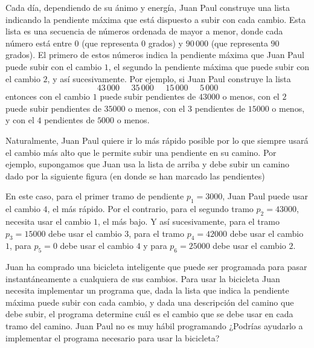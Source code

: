 \documentclass{oci}
\begin{document}
\begin{problemDescription}
Cada día, dependiendo de su ánimo y energía, Juan Paul construye una lista indicando la pendiente 
máxima que está dispuesto a 
subir con cada cambio. 
Esta lista es una secuencia de números ordenada de mayor a menor, donde cada
número está entre $0$ (que representa $0$ grados) y $90\,000$ (que representa
$90$ grados).
El primero de estos números indica la pendiente máxima que Juan Paul puede 
subir con el cambio $1$, el segundo la pendiente máxima que puede 
subir con el cambio $2$, y así sucesivamente.
Por ejemplo, si Juan Paul construye la lista
\[
43\, 000\;\;\;\;\; 35\, 000\;\;\;\;\; 15\, 000\;\;\;\;\; 5\, 000
\]
entonces con el cambio $1$ puede subir pendientes de $43000$ o menos, con el 
$2$ puede subir pendientes de $35000$ o menos, con el $3$ pendientes de
$15000$ o menos, y con el $4$ pendientes de $5000$ o menos.

Naturalmente, Juan Paul quiere ir lo más rápido posible por lo que 
siempre usará el cambio más alto que le permite subir
una pendiente en su camino.
Por ejemplo, supongamos que Juan usa la lista de arriba y debe subir un 
camino dado por la siguiente figura (en donde se han marcado
las pendientes)
\begin{center}

\end{center}

En este caso, para el primer tramo de pendiente $p_1=3000$, Juan Paul puede usar el cambio $4$, 
el más rápido.
Por el contrario, para el segundo tramo $p_2=43 000$, necesita usar el cambio $1$, el más bajo. 
Y así sucesivamente, para el tramo $p_3=15 000$ debe usar el cambio $3$, para el tramo $p_4=42 000$
debe usar el cambio $1$, para $p_5=0$ debe usar el cambio $4$ y para $p_6=25 000$ debe usar
el cambio $2$.

Juan ha comprado una bicicleta inteligente que puede ser programada para 
pasar instantáneamente a cualquiera de sus cambios. 
Para usar la bicicleta Juan necesita implementar un programa que, dada
la lista que indica la pendiente máxima puede subir con cada cambio,
y dada una descripción del camino que debe subir,
el programa determine cuál es el cambio que se debe usar en cada tramo del camino.
Juan Paul no es muy hábil programando ¿Podrías ayudarlo a implementar el
programa necesario para usar la bicicleta?
 


\end{problemDescription}
\end{document}
